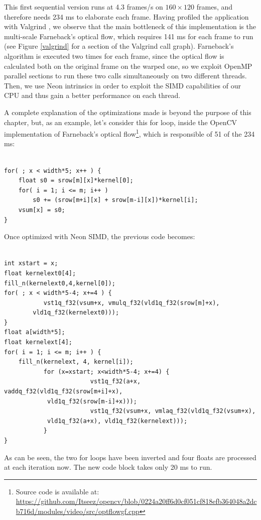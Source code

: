 This first sequential version runs at 4.3 frames/s on $160\times 120$ frames, and therefore needs 234 ms to elaborate each frame. Having profiled the application with Valgrind \cite{nethercote2007valgrind}, we observe that the main bottleneck of this implementation is the multi-scale Farneback's optical flow, which requires 141 ms for each frame to run (see Figure \ref{valgrind} for a section of the Valgrind call graph). Farneback's algorithm is executed two times for each frame, since the optical flow is calculated both on the original frame on the warped one, so we exploit OpenMP parallel sections to run these two calls simultaneously on two different threads. Then, we use Neon intrinsics in order to exploit the SIMD capabilities of our CPU and thus gain a better performance on each thread.

A complete explanation of the optimizations made is beyond the purpose of this chapter, but, as an example, let's consider this for loop, inside the OpenCV implementation of Farneback's optical flow\footnote{Source code is available at: \url{https://github.com/Itseez/opencv/blob/0224a20ff6d0cf051cf818efb364048a2dcb716d/modules/video/src/optflowgf.cpp}}, which is responsible of 51 of the 234 ms:
\begin{lstlisting}[frame=single]  % Start your code-block

for( ; x < width*5; x++ ) {
	float s0 = srow[m][x]*kernel[0];
	for( i = 1; i <= m; i++ )
		s0 += (srow[m+i][x] + srow[m-i][x])*kernel[i];
	vsum[x] = s0;
}
\end{lstlisting}

Once optimized with Neon SIMD, the previous code becomes:
\begin{lstlisting}[frame=single]  % Start your code-block

int xstart = x;
float kernelext0[4];
fill_n(kernelext0,4,kernel[0]);
for( ; x < width*5-4; x+=4 ) {
           vst1q_f32(vsum+x, vmulq_f32(vld1q_f32(srow[m]+x),
		vld1q_f32(kernelext0)));
}
float a[width*5];
float kernelext[4];
for( i = 1; i <= m; i++ ) {
	fill_n(kernelext, 4, kernel[i]);
           for (x=xstart; x<width*5-4; x+=4) {
                        vst1q_f32(a+x, vaddq_f32(vld1q_f32(srow[m+i]+x), 
			vld1q_f32(srow[m-i]+x)));
                        vst1q_f32(vsum+x, vmlaq_f32(vld1q_f32(vsum+x), 
			vld1q_f32(a+x), vld1q_f32(kernelext)));
           }
}
\end{lstlisting}
As can be seen, the two for loops have been inverted and four floats are processed at each iteration now. The new code block takes only 20 ms to run.

